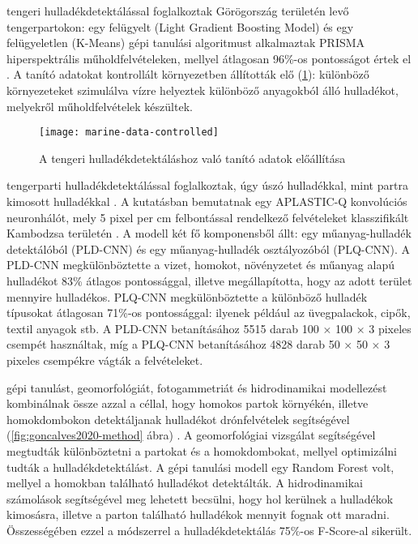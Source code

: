 \citeauthor{Taggio2022} tengeri hulladékdetektálással foglalkoztak Görögország területén levő tengerpartokon: egy felügyelt (Light Gradient Boosting Model) és egy felügyeletlen (K-Means) gépi tanulási algoritmust alkalmaztak PRISMA hiperspektrális műholdfelvételeken, mellyel átlagosan 96\%-os pontosságot értek el \cite{Taggio2022}. A tanító adatokat kontrollált környezetben állították elő (\ref{fig:marine-data-controlled}): különböző környezeteket szimulálva vízre helyeztek különböző anyagokból álló hulladékot, melyekről műholdfelvételek készültek.

\begin{figure}[H]
	\centering
	\texttt{[image: marine-data-controlled]}
	\caption{A tengeri hulladékdetektáláshoz való tanító adatok előállítása \cite{Taggio2022}}
    \label{fig:marine-data-controlled}
\end{figure}

\citeauthor{Wolf2020} tengerparti hulladékdetektálással foglalkoztak, úgy úszó hulladékkal, mint partra kimosott hulladékkal \cite{Wolf2020}. A kutatásban bemutatnak egy APLASTIC-Q konvolúciós neuronhálót, mely 5 pixel per cm felbontással rendelkező felvételeket klasszifikált Kambodzsa területén . A modell két fő komponensből állt: egy műanyag-hulladék detektálóból (PLD-CNN) és egy műanyag-hulladék osztályozóból (PLQ-CNN). A PLD-CNN megkülönböztette a vizet, homokot, növényzetet és műanyag alapú hulladékot 83\% átlagos pontossággal, illetve megállapította, hogy az adott terület mennyire hulladékos. PLQ-CNN megkülönböztette a különböző hulladék típusokat átlagosan 71\%-os pontossággal: ilyenek például az üvegpalackok, cipők, textil anyagok stb. A PLD-CNN betanításához 5515 darab 100 × 100 × 3 pixeles csempét használtak, míg a PLQ-CNN betanításához 4828 darab 50 × 50 × 3 pixeles csempékre vágták a felvételeket. 

\citeauthor{Goncalves2020} gépi tanulást, geomorfológiát, fotogammetriát és hidrodinamikai modellezést kombinálnak össze azzal a céllal, hogy homokos partok környékén, illetve homokdombokon detektáljanak hulladékot drónfelvételek segítségével (\ref{fig:goncalves2020-method} ábra) \cite{Goncalves2020}. A geomorfológiai vizsgálat segítségével megtudták különböztetni a partokat és a homokdombokat, mellyel optimizálni tudták a hulladékdetektálást. A gépi tanulási modell egy Random Forest volt, mellyel a homokban található hulladékot detektálták. A hidrodinamikai számolások segítségével meg lehetett becsülni, hogy hol kerülnek a hulladékok kimosásra, illetve a parton található hulladékok mennyit fognak ott maradni. Összességében ezzel a módszerrel a hulladékdetektálás 75\%-os F-Score-al sikerült.


